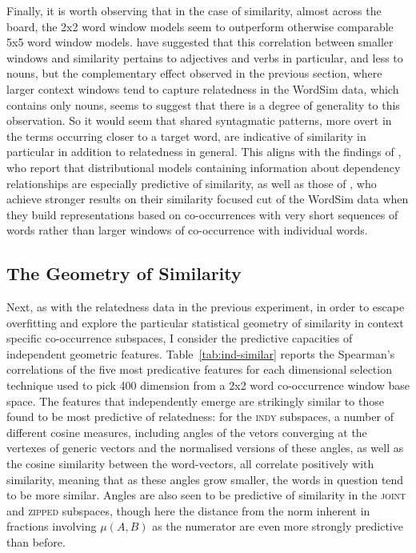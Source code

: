 Finally, it is worth observing that in the case of similarity, almost across the board, the 2x2 word window models seem to outperform otherwise comparable 5x5 word window models.  \cite{HillEA2015} have suggested that this correlation between smaller windows and similarity pertains to adjectives and verbs in particular, and less to nouns, but the complementary effect observed in the previous section, where larger context windows tend to capture relatedness in the WordSim data, which contains only nouns, seems to suggest that there is a degree of generality to this observation.  So it would seem that shared syntagmatic patterns, more overt in the terms occurring closer to a target word, are indicative of similarity in particular in addition to relatedness in general.  This aligns with the findings of \cite{KielaEA2014}, who report that distributional models containing information about dependency relationships are especially predictive of similarity, as well as those of \cite{AgirreEA2009}, who achieve stronger results on their similarity focused cut of the WordSim data when they build representations based on co-occurrences with very short sequences of words rather than larger windows of co-occurrence with individual words.

\subsection{The Geometry of Similarity}
Next, as with the relatedness data in the previous experiment, in order to escape overfitting and explore the particular statistical geometry of similarity in context specific co-occurrence subspaces, I consider the predictive capacities of independent geometric features.  Table~\ref{tab:ind-similar} reports the Spearman's correlations of the five most predicative features for each dimensional selection technique used to pick 400 dimension from a 2x2 word co-occurrence window base space.  The features that independently emerge are strikingly similar to those found to be most predictive of relatedness: for the \textsc{indy} subspaces, a number of different cosine measures, including angles of the vetors converging at the vertexes of generic vectors and the normalised versions of these angles, as well as the cosine similarity between the word-vectors, all correlate positively with similarity, meaning that as these angles grow smaller, the words in question tend to be more similar.  Angles are also seen to be predictive of similarity in the \textsc{joint} and \textsc{zipped} subspaces, though here the distance from the norm inherent in fractions involving $\mu(A,B)$ as the numerator are even more strongly predictive than before.

